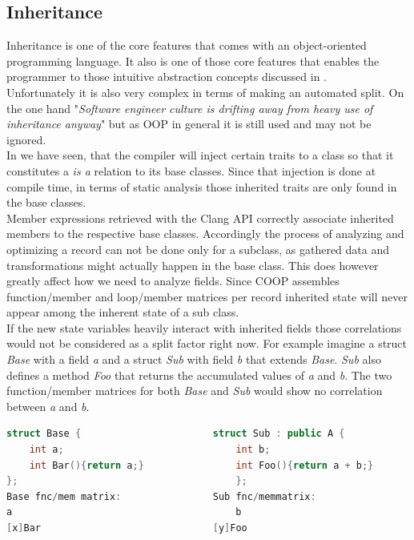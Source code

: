 \subsection{Inheritance}\label{inheritance}
Inheritance is one of the core features that comes with an object-oriented programming language. It also is one of those core features that enables the programmer to those intuitive abstraction concepts discussed in .\\
Unfortunately it is also very complex in terms of making an automated split. On the one hand "\textit{Software engineer culture is drifting away from heavy use of inheritance anyway}"  but as OOP in general it is still used and may not be ignored.\\
In  we have seen, that the compiler will inject certain traits to a class so that it constitutes a \textit{is a} relation to its base classes. Since that injection is done at compile time, in terms of static analysis those inherited traits are only found in the base classes.\\
Member expressions retrieved with the Clang API correctly associate inherited members to the respective base classes. Accordingly the process of analyzing and optimizing a record can not be done only for a subclass, as gathered data and transformations might actually happen in the base class. This does however greatly affect how we need to analyze fields. Since COOP assembles function/member and loop/member matrices per record inherited state will never appear among the inherent state of a sub class.\\
If the new state variables heavily interact with inherited fields those correlations would not be considered as a split factor right now. For example imagine a struct \textit{Base} with a field \textit{a} and a struct \textit{Sub} with field \textit{b} that extends \textit{Base}. \textit{Sub} also defines a method \textit{Foo} that returns the accumulated values of \textit{a} and \textit{b}. The two function/member matrices for both \textit{Base} and \textit{Sub} would show no correlation between \textit{a} and \textit{b}.
\newpage
\begin{lstlisting}[language=C++, name={Function/Member matrices for classes related by inheritance.}, label={inheritance_fmm}]
struct Base {						struct Sub : public A {
	int a;								int b;
	int Bar(){return a;}				int Foo(){return a + b;}
};										};
Base fnc/mem matrix:				Sub fnc/memmatrix:
a										b
[x]Bar								[y]Foo
\end{lstlisting}
